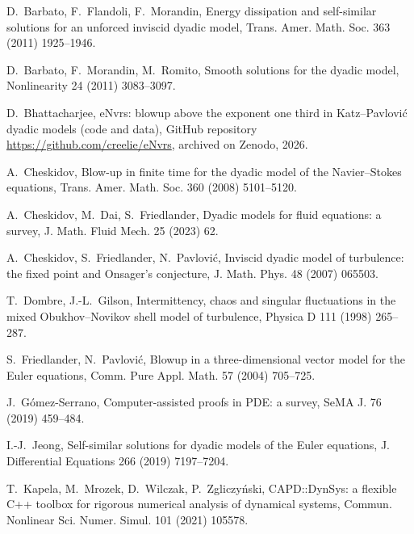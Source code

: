 
 D.~Barbato, F.~Flandoli, F.~Morandin, Energy dissipation and
self-similar solutions for an unforced inviscid dyadic model, Trans. Amer.
Math. Soc. 363 (2011) 1925--1946. 

 D.~Barbato, F.~Morandin, M.~Romito, Smooth solutions for the
dyadic model, Nonlinearity 24 (2011) 3083--3097.

 D.~Bhattacharjee, eNvrs: blowup above the exponent one third in
Katz--Pavlovi\'c dyadic models (code and data), GitHub repository
\url{https://github.com/creelie/eNvrs}, archived on Zenodo, 2026.

 A.~Cheskidov, Blow-up in finite time for the dyadic model of
the Navier--Stokes equations, Trans. Amer. Math. Soc. 360 (2008) 5101--5120.

 A.~Cheskidov, M.~Dai, S.~Friedlander, Dyadic models for fluid
equations: a survey, J. Math. Fluid Mech. 25 (2023) 62.

 A.~Cheskidov, S.~Friedlander, N.~Pavlovi\'c, Inviscid dyadic
model of turbulence: the fixed point and Onsager's conjecture, J. Math. Phys.
48 (2007) 065503. 

 T.~Dombre, J.-L.~Gilson, Intermittency, chaos and singular
fluctuations in the mixed Obukhov--Novikov shell model of turbulence,
Physica D 111 (1998) 265--287. 

 S.~Friedlander, N.~Pavlovi\'c, Blowup in a three-dimensional
vector model for the Euler equations, Comm. Pure Appl. Math. 57 (2004)
705--725. 

 J.~G\'omez-Serrano, Computer-assisted proofs in PDE: a survey,
SeMA J. 76 (2019) 459--484. 

 I.-J.~Jeong, Self-similar solutions for dyadic models of the
Euler equations, J. Differential Equations 266 (2019) 7197--7204.

 T.~Kapela, M.~Mrozek, D.~Wilczak, P.~Zgliczy\'nski,
CAPD::DynSys: a flexible C++ toolbox for rigorous numerical analysis of
dynamical systems, Commun. Nonlinear Sci. Numer. Simul. 101 (2021) 105578.

